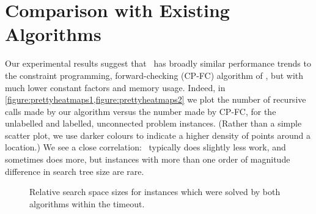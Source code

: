 \section{Comparison with Existing Algorithms}
\label{sec:comparison}

Our experimental results suggest that \McSplit\ has broadly similar performance
trends to the constraint programming, forward-checking (CP-FC) algorithm of
\citet{DBLP:conf/cp/NdiayeS11}, but with much lower constant factors and memory usage. Indeed,
in \cref{figure:prettyheatmaps1,figure:prettyheatmaps2} we plot the number of
recursive calls made by our algorithm versus the number made by
CP-FC, for the unlabelled and labelled, unconnected problem
instances. (Rather than a simple scatter plot, we use darker colours to
indicate a higher density of points around a location.) We see a close
correlation: \McSplit\ typically does slightly less work, and sometimes does more, but
instances with more than one order of magnitude difference in search tree size
are rare.

\begin{figure}[htb]
    \centering
    \caption{Relative search space sizes for instances which were solved by both algorithms within the timeout.}
    \label{figure:prettyheatmaps}
\end{figure}

